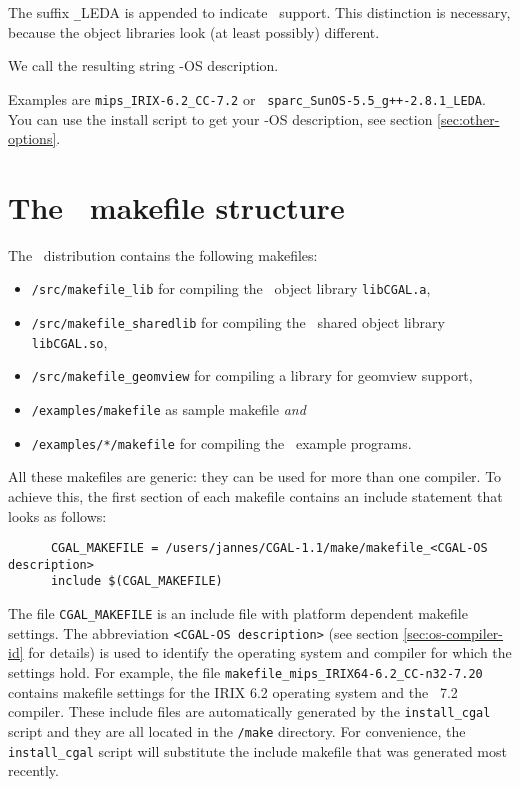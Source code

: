 The suffix \texttt{\_}LEDA is appended to indicate \leda\ support. This
distinction is necessary, because the object libraries look (at least
possibly) different.

We call the resulting string \cgal-OS description. 

Examples are \texttt{mips\_IRIX-6.2\_CC-7.2} or {\tt
  sparc\_SunOS-5.5\_g++-2.8.1\_LEDA}. You can use the install
script to get your \cgal-OS description, see section
\ref{sec:other-options}.

\section{The \cgal\ makefile structure}\label{sec:makefiles}

The \cgal\ distribution contains the following makefiles:
\begin{itemize}
\item \texttt{\cgaldir/src/makefile\_lib} for compiling the \cgal\ 
  object library \texttt{libCGAL.a},
  
\item \texttt{\cgaldir/src/makefile\_sharedlib} for compiling the
  \cgal\ shared object library \texttt{libCGAL.so},
  
\item \texttt{\cgaldir/src/makefile\_geomview} for compiling a library
  for geomview support,
  
\item \texttt{\cgaldir/examples/makefile} as sample makefile
  \textit{and}
  
\item \texttt{\cgaldir/examples/*/makefile} for compiling the \cgal\ 
  example programs.
\end{itemize}

All these makefiles are generic: they can be used for more than one
compiler.  To achieve this, the first section of each makefile
contains an include statement that looks as follows:

\begin{verbatim}
      CGAL_MAKEFILE = /users/jannes/CGAL-1.1/make/makefile_<CGAL-OS description>
      include $(CGAL_MAKEFILE)
\end{verbatim}

The file \texttt{CGAL\_MAKEFILE} is an include file with platform
dependent makefile settings. The abbreviation \texttt{<CGAL-OS
  description>} (see section \ref{sec:os-compiler-id} for details) is
used to identify the operating system and compiler for which the
settings hold. For example, the file
\texttt{makefile\_mips\_IRIX64-6.2\_CC-n32-7.20} contains makefile
settings for the IRIX 6.2 operating system and the \mipsprocc\ 7.2
compiler.  These include files are automatically generated by the
\texttt{install\_cgal} script and they are all located in the
\texttt{\cgaldir/make} directory.  For convenience, the
\texttt{install\_cgal} script will substitute the include makefile
that was generated most recently.

